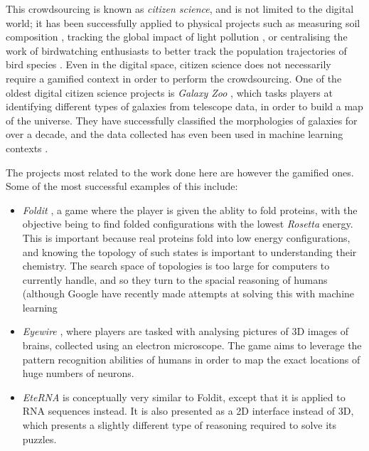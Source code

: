 This crowdsourcing is known as \emph{citizen science}, and is not limited to the digital world; it has been successfully applied to physical projects such as measuring soil composition \cite{Rossiter2015}, tracking the global impact of light pollution \cite{Cui2020}, or centralising the work of birdwatching enthusiasts to better track the population trajectories of bird species \cite{Link2008}.
Even in the digital space, citizen science does not necessarily require a gamified context in order to perform the crowdsourcing. One of the oldest digital citizen science projects is \emph{Galaxy Zoo} \cite{Masters2019}, which tasks players at identifying different types of galaxies from telescope data, in order to build a map of the universe. They have successfully classified the morphologies of galaxies for over a decade, and the data collected has even been used in machine learning contexts \cite{Walmsley2020}.

The projects most related to the work done here are however the gamified ones. Some of the most successful examples of this include:
\begin{itemize}[leftmargin=*]
  \item \emph{Foldit} \cite{Cooper2010}, a game where the player is given the ablity to fold proteins, with the objective being to find folded configurations with the lowest \emph{Rosetta} energy. This is important because real proteins fold into low energy configurations, and knowing the topology of such states is important to understanding their chemistry. The search space of topologies is too large for computers to currently handle, and so they turn to the spacial reasoning of humans (although Google have recently made attempts at solving this with machine learning \cite{Senior2020}
  \item \emph{Eyewire} \cite{Bae2018}, where players are tasked with analysing pictures of 3D images of brains, collected using an electron microscope. The game aims to leverage the pattern recognition abilities of humans in order to map the exact locations of huge numbers of neurons.
  \item \emph{EteRNA} \cite{Lee2014} is conceptually very similar to Foldit, except that it is applied to RNA sequences instead. It is also presented as a 2D interface instead of 3D, which presents a slightly different type of reasoning required to solve its puzzles.
\end{itemize}

